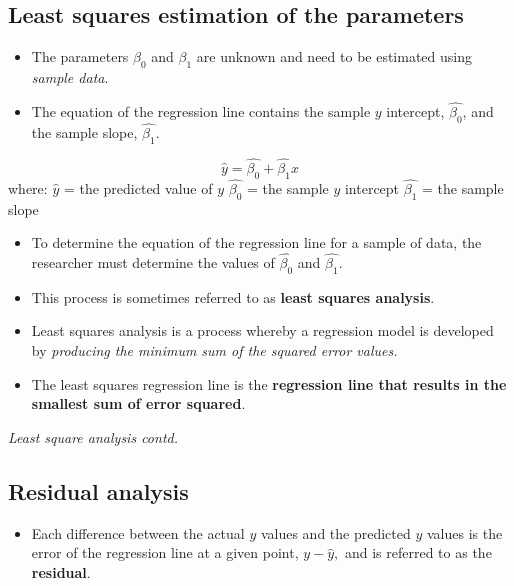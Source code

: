 \documentclass[]{book}
\providecommand{\tightlist}{%
  \setlength{\itemsep}{0pt}\setlength{\parskip}{0pt}}
\begin{document}
\hypertarget{least-squares-estimation-of-the-parameters}{%
\subsection{Least squares estimation of the parameters}\label{least-squares-estimation-of-the-parameters}}

\begin{itemize}
\tightlist
\item
  The parameters \(\beta_0\) and \(\beta_1\) are unknown and need to be estimated using \emph{sample data}.
\item
  The equation of the regression line contains the sample \(y\) intercept, \(\hat{\beta_0}\), and the sample slope, \(\hat{\beta_1}\).
\end{itemize}

\[\hat{y} = \hat{\beta_0}+\hat{\beta_1}x\]
where:
\(\hat{y}\) = the predicted value of \(y\) \newline
\(\hat{\beta_0}\) = the sample \(y\) intercept \newline
\(\hat{\beta_1}\) = the sample slope

\begin{itemize}
\tightlist
\item
  To determine the equation of the regression line for a sample of data, the researcher must determine the values of \(\hat{\beta_0}\) and \(\hat{\beta_1}.\)
\item
  This process is sometimes referred to as \textbf{least squares analysis}.
\item
  Least squares analysis is a process whereby a regression model is developed by \emph{producing the minimum sum of the squared error values.}
\item
  The least squares regression line is the \textbf{regression line that results in the smallest sum of error squared}.
\end{itemize}

\newpage

\emph{Least square analysis contd.}

\hypertarget{residual-analysis}{%
\subsection{Residual analysis}\label{residual-analysis}}

\begin{itemize}
\tightlist
\item
  Each difference between the actual \(y\) values and the predicted \(y\) values is the error of the regression line at a given point, \(y-\hat{y},\) and is referred to as the \textbf{residual}.
\end{itemize}
\end{document}
